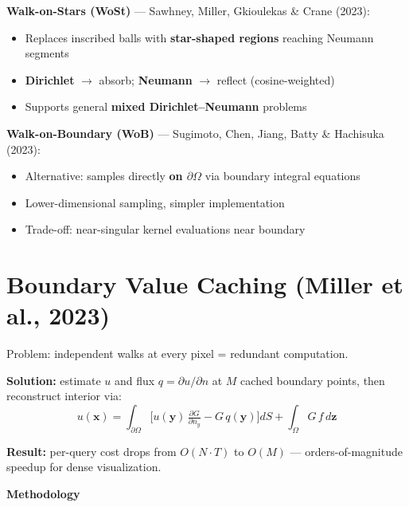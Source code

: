 \documentclass[11pt]{article}
\begin{document}
\textbf{Walk-on-Stars (WoSt)} --- Sawhney, Miller, Gkioulekas \& Crane (2023):
\begin{itemize}
  \item Replaces inscribed balls with \textbf{star-shaped regions} reaching Neumann segments
  \item \textbf{Dirichlet} $\to$ absorb; \textbf{Neumann} $\to$ reflect (cosine-weighted)
  \item Supports general \textbf{mixed Dirichlet--Neumann} problems
\end{itemize}

\textbf{Walk-on-Boundary (WoB)} --- Sugimoto, Chen, Jiang, Batty \& Hachisuka (2023):
\begin{itemize}
  \item Alternative: samples directly \textbf{on $\partial\Omega$} via boundary integral equations
  \item Lower-dimensional sampling, simpler implementation
  \item Trade-off: near-singular kernel evaluations near boundary
\end{itemize}

\section{Boundary Value Caching (Miller et al., 2023)}

Problem: independent walks at every pixel = redundant computation.

\textbf{Solution:} estimate $u$ and flux $q = \partial u / \partial n$ at $M$ cached boundary points, then reconstruct interior via:
\[
  u(\mathbf{x})
  = \int_{\partial\Omega}\!\Big[
    u(\mathbf{y})\,\tfrac{\partial G}{\partial n_y}
    - G\,q(\mathbf{y})
  \Bigr]dS
  + \int_{\Omega}\!G\,f\,d\mathbf{z}
\]

\textbf{Result:} per-query cost drops from $O(N \cdot T)$ to $O(M)$ --- orders-of-magnitude speedup for dense visualization.

\newpage

\begin{center}
  {\LARGE\bfseries\color{accent} Methodology}
\end{center}

\vspace{8pt}

\end{document}
